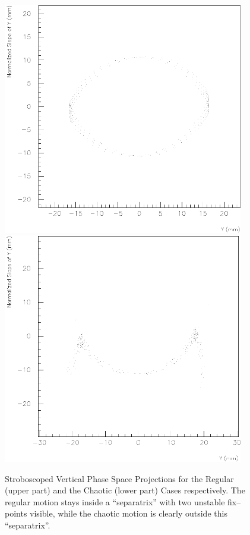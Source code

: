 \begin{figure}[H]
\begin{center}
  \mbox{\includegraphics*[width=10.5cm]{figures/exp6}}
  \\[5mm]
  \mbox{\includegraphics*[width=10.5cm]{figures/exp14}}
 \caption{\small{Stroboscoped Vertical Phase Space Projections
     for the Regular (upper part) and the Chaotic (lower part) Cases
     respectively.  The regular motion stays inside a ``separatrix''
     with two unstable fix--points visible, while the chaotic motion
     is clearly outside this ``separatrix''.}}
 \label{P-stro}
\end{center}
\end{figure}

